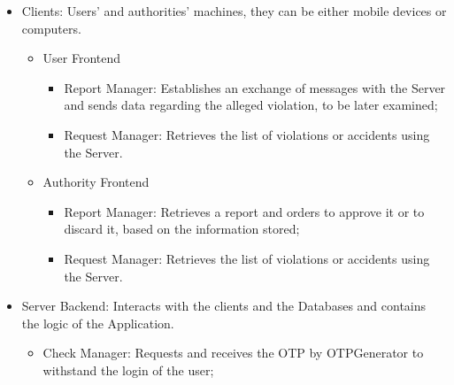     \begin{itemize}

        \item Clients: Users' and authorities' machines, they 
        can be either mobile devices or computers.
        
        \begin{itemize}

            \item User Frontend

            \begin{itemize}

                \item Report Manager: Establishes an exchange 
                of messages with the Server and sends data 
                regarding the alleged violation, to be 
                later examined;
                
                \item Request Manager: Retrieves the list of 
                violations or accidents using the Server.
                
            \end{itemize}

            \item Authority Frontend

            \begin{itemize}

                \item Report Manager: Retrieves a report and 
                orders to approve it or to discard it, 
                based on the information stored;
                
                \item Request Manager: Retrieves the list 
                of violations or accidents using the Server.
                
            \end{itemize}
            
        \end{itemize}

        \item Server Backend: Interacts with the clients and 
        the Databases and contains the logic of the Application.
        
        \begin{itemize}
            \item Check Manager: Requests and receives the OTP 
            by OTPGenerator to withstand the login of the user;
            

\end{itemize}
\end{itemize}
